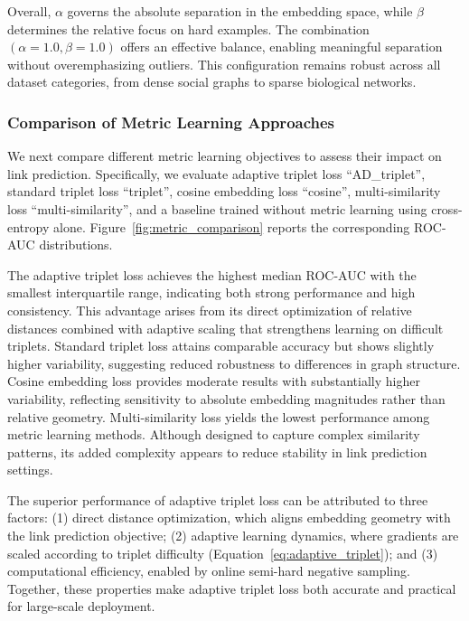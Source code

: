 \documentclass[pdflatex,sn-mathphys-num]{sn-jnl}%
\theoremstyle{thmstyleone}%
\theoremstyle{thmstyletwo}%
\theoremstyle{thmstylethree}%
\theoremstyle{plain} %
\theoremstyle{definition} %
\theoremstyle{remark} %
\theoremstyle{plain} %
\begin{document}
Overall, $\alpha$ governs the absolute separation in the embedding space, while $\beta$ determines the relative focus on hard examples. 
The combination $(\alpha=1.0, \beta=1.0)$ offers an effective balance, enabling meaningful separation without overemphasizing outliers. 
This configuration remains robust across all dataset categories, from dense social graphs to sparse biological networks.

\subsubsection{Comparison of Metric Learning Approaches}
\label{subsubsec:metric_approaches}

We next compare different metric learning objectives to assess their impact on link prediction. 
Specifically, we evaluate adaptive triplet loss ``AD\_triplet'', standard triplet loss ``triplet'', cosine embedding loss ``cosine'', multi-similarity loss ``multi-similarity'', and a baseline trained without metric learning using cross-entropy alone. 
Figure~\ref{fig:metric_comparison} reports the corresponding ROC-AUC distributions.

The adaptive triplet loss achieves the highest median ROC-AUC with the smallest interquartile range, indicating both strong performance and high consistency. 
This advantage arises from its direct optimization of relative distances combined with adaptive scaling that strengthens learning on difficult triplets.
Standard triplet loss attains comparable accuracy but shows slightly higher variability, suggesting reduced robustness to differences in graph structure.
Cosine embedding loss provides moderate results with substantially higher variability, reflecting sensitivity to absolute embedding magnitudes rather than relative geometry.
Multi-similarity loss yields the lowest performance among metric learning methods. Although designed to capture complex similarity patterns, its added complexity appears to reduce stability in link prediction settings.

The superior performance of adaptive triplet loss can be attributed to three factors: (1) {direct distance optimization}, which aligns embedding geometry with the link prediction objective; (2) {adaptive learning dynamics}, where gradients are scaled according to triplet difficulty (Equation~\ref{eq:adaptive_triplet}); and (3) {computational efficiency}, enabled by online semi-hard negative sampling. Together, these properties make adaptive triplet loss both accurate and practical for large-scale deployment.
\end{document}
